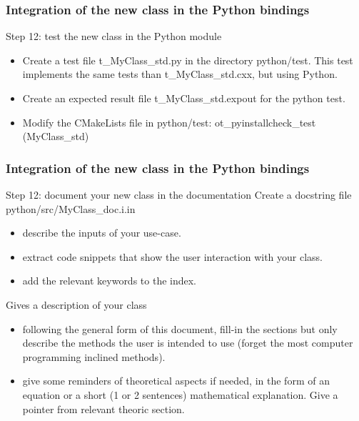 \documentclass[8pt]{beamer}
\begin{document}
\begin{frame}
  \frametitle{Integration of the new class in the Python bindings}
  \begin{block}{Step 12: test the new class in the Python module}
    \begin{itemize}
    \item Create a test file t\_MyClass\_std.py in the directory python/test. This test implements the same tests than t\_MyClass\_std.cxx, but using Python.
    \item Create an expected result file t\_MyClass\_std.expout for the python test.
    \item Modify the CMakeLists file in python/test:
      {\ttfamily ot\_pyinstallcheck\_test (MyClass\_std)}
    \end{itemize}
  \end{block}
\end{frame}
\begin{frame}
  \frametitle{Integration of the new class in the Python bindings}
  \begin{block}{Step 12: document your new class in the documentation}
    Create a docstring file python/src/MyClass\_doc.i.in
    \begin{itemize}
    \item describe the inputs of your use-case.
    \item extract code snippets that show the user interaction with your class.
    \item add the relevant keywords to the index.
    \end{itemize}
    Gives a description of your class
    \begin{itemize}
    \item following the general form of this document, fill-in the sections but only describe the methods the user is intended to use (forget the most computer programming inclined methods).
    \item give some reminders of theoretical aspects if needed, in the form of an equation or a short (1 or 2 sentences) mathematical explanation. Give a pointer from relevant theoric section.
    \end{itemize}
  \end{block}
\end{frame}
\end{document}
